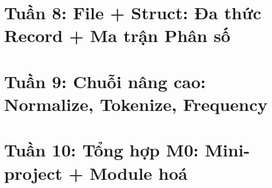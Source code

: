 \documentclass[12pt,a4paper]{report}
\begin{document}
\chapter{Tuần 8: File + Struct: Đa thức Record + Ma trận Phân số}











\chapter{Tuần 9: Chuỗi nâng cao: Normalize, Tokenize, Frequency}











\chapter{Tuần 10: Tổng hợp M0: Mini-project + Module hoá}










\end{document}
